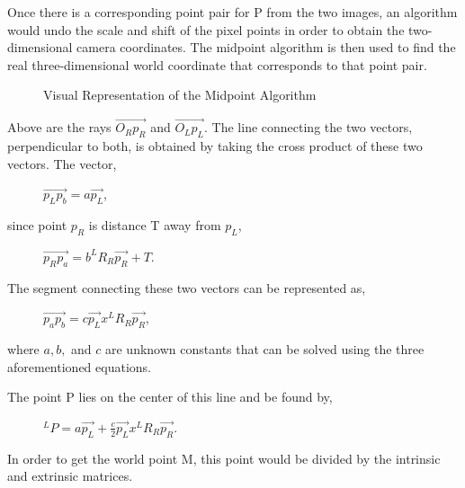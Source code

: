 \documentclass[pdftex,10.5pt]{report}
\begin{document}
Once there is a corresponding point pair for P from the two images, an algorithm would undo the scale and shift of the pixel points in order to obtain the two-dimensional camera coordinates. The midpoint algorithm is then used to find the real three-dimensional world coordinate that corresponds to that point pair.

\begin{figure}[H]
\centering
	\caption{Visual Representation of the Midpoint Algorithm}
\end{figure}

Above are the rays $\vec{O_{R}p_{R}}$ and $\vec{O_{L}p_{L}}$. The line connecting the two vectors, perpendicular to both, is obtained by taking the cross product of these two vectors. The vector,
\begin{figure}[H]
\centering
	 $\vec{p_{L}p_{b}} = a\vec{p_{L}}$, 
\end{figure}	 
since point $p_{R}$ is distance T away from $p_{L}$, 
\begin{figure}[H]
\centering
	$\vec{p_{R}p_{a}} = b^{L}R_{R}\vec{p_{R}}+T$. 
\end{figure}	
The segment connecting these two vectors can be represented as,
\begin{figure}[H]
\centering
	 $\vec{p_{a}p_{b}} = c\vec{p_{L}}x^{L}R_{R}\vec{p_{R}}$,
\end{figure}
where $a,b,$ and $c$ are unknown constants that can be solved using the three aforementioned equations.

The point P lies on the center of this line and be found by,
\begin{figure}[H]
\centering
 	$^{L}P=a\vec{p_{L}}+\frac{c}{2}\vec{p_{L}}x^{L}R_{R}\vec{p_{R}}$.
 \end{figure}
 In order to get the world point M, this point would be divided by the intrinsic and extrinsic matrices.
\end{document}

